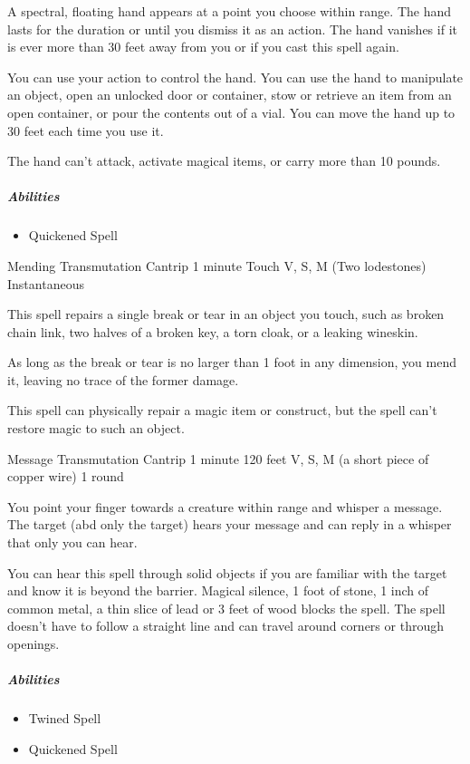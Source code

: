 \documentclass[letterpaper,openany,oneside,twocolumn]{book}
\begin{document}
A spectral, floating hand appears at a point you choose within range. The hand lasts for the duration or until you dismiss it as an action. The hand vanishes if it is ever more than 30 feet away from you or if you cast this spell again.

You can use your action to control the hand. You can use the hand to manipulate an object, open an unlocked door or container, stow or retrieve an item from an open container, or pour the contents out of a vial. You can move the hand up to 30 feet each time you use it.

The hand can't attack, activate magical items, or carry more than 10 pounds.

\subparagraph*{Abilities}
\begin{itemize}
  \item Quickened Spell
\end{itemize}

\DndSpellHeader
  {Mending}
  {Transmutation Cantrip}
  {1 minute}
  {Touch}
  {V, S, M (Two lodestones)}
  {Instantaneous}

This spell repairs a single break or tear in an object you touch, such as broken chain link, two halves of a broken key, a torn cloak, or a leaking wineskin.

As long as the break or tear is no larger than 1 foot in any dimension, you mend it, leaving no trace of the former damage.

This spell can physically repair a magic item or construct, but the spell can't restore magic to such an object.

\DndSpellHeader
  {Message}
  {Transmutation Cantrip}
  {1 minute}
  {120 feet}
  {V, S, M (a short piece of copper wire)}
  {1 round}

  You point your finger towards a creature within range and whisper a message. The target (abd only the target) hears your message and can reply in a whisper that only you can hear.

  You can hear this spell through solid objects if you are familiar with the target and know it is beyond the barrier. Magical silence, 1 foot of stone, 1 inch of common metal, a thin slice of lead or 3 feet of wood blocks the spell. The spell doesn't have to follow a straight line and can travel around corners or through openings.

\subparagraph*{Abilities}
\begin{itemize}
  \item Twined Spell
  \item Quickened Spell
\end{itemize}
\end{document}
